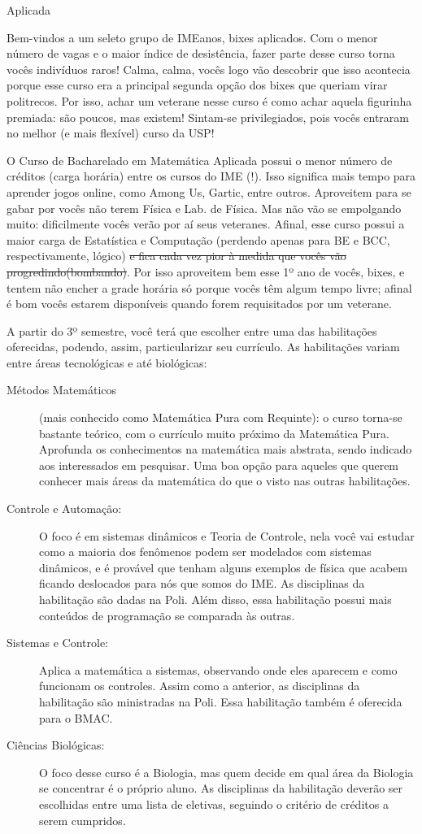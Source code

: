 \begin{subsecao}{Aplicada}

Bem-vindos a um seleto grupo de IMEanos, bixes aplicados. Com o menor número de
vagas e o maior índice de desistência, fazer parte desse curso torna vocês
indivíduos raros!  Calma, calma, vocês logo vão descobrir que isso acontecia
porque esse curso era a principal segunda opção dos bixes que queriam virar
politrecos. Por isso, achar um veterane nesse curso é como achar aquela
figurinha premiada: são poucos, mas existem! Sintam-se privilegiados, pois vocês
entraram no melhor (e mais flexível) curso da USP!

O Curso de Bacharelado em Matemática Aplicada possui o menor número de créditos
(carga horária) entre os cursos do IME (!). Isso significa mais tempo para
aprender jogos online, como Among Us, Gartic, entre outros. Aproveitem para se gabar 
por vocês não terem Física e Lab. de Física. Mas não vão se empolgando muito: 
dificilmente vocês verão por aí seus veteranes. Afinal, esse curso possui a maior carga 
de Estatística e Computação (perdendo apenas para BE e BCC, respectivamente, lógico) 
\sout{e fica cada vez pior à medida que vocês vão progredindo(bombando)}. 
Por isso aproveitem bem esse 1º ano de vocês, bixes, e tentem não encher a grade
horária só porque vocês têm algum tempo livre; afinal é bom vocês estarem
disponíveis quando forem requisitados por um veterane.

A partir do 3º semestre, você terá que escolher entre uma das habilitações
oferecidas, podendo, assim, particularizar seu currículo. As habilitações variam
entre áreas tecnológicas e até biológicas:
\begin{description}
\item [Métodos Matemáticos] (mais conhecido como Matemática Pura com Requinte):
  o curso torna-se bastante teórico, com o currículo muito próximo da Matemática
  Pura. Aprofunda os conhecimentos na matemática mais abstrata, sendo indicado
  aos interessados em pesquisar. Uma boa opção para aqueles que querem conhecer
  mais áreas da matemática do que o visto nas outras habilitações.
\item [Controle e Automação:]  O foco é em sistemas dinâmicos e Teoria de
  Controle, nela você vai estudar como a maioria dos fenômenos podem ser
  modelados com sistemas dinâmicos, e é provável que tenham alguns exemplos de
  física que acabem ficando deslocados para nós que somos do IME. As disciplinas
  da habilitação são dadas na Poli. Além disso, essa habilitação possui mais
  conteúdos de programação se comparada às outras.
\item [Sistemas e Controle:] Aplica a matemática a sistemas, observando onde
  eles aparecem e como funcionam os controles. Assim como a anterior, as
  disciplinas da habilitação são ministradas na Poli. Essa habilitação também é
  oferecida para o BMAC.
\item [Ciências Biológicas:] O foco desse curso é a Biologia, mas quem decide em
  qual área da Biologia se concentrar é o próprio aluno. As disciplinas da
  habilitação deverão ser escolhidas entre uma lista de eletivas, seguindo o
  critério de créditos a serem cumpridos.
\end{description}


\end{subsecao}
